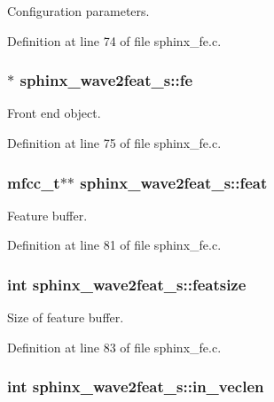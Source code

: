 Configuration parameters. 



Definition at line 74 of file sphinx\-\_\-fe.\-c.

\subsubsection[{fe}]{$\ast$ sphinx\-\_\-wave2feat\-\_\-s\-::fe}\label{structsphinx__wave2feat__s_a5882f148fe200890855304b46f00ee4b}


Front end object. 



Definition at line 75 of file sphinx\-\_\-fe.\-c.

\subsubsection[{feat}]{\setlength{\rightskip}{0pt plus 5cm}mfcc\-\_\-t$\ast$$\ast$ sphinx\-\_\-wave2feat\-\_\-s\-::feat}\label{structsphinx__wave2feat__s_ab43d8d5721133bcaf02da23c0bbb58ae}


Feature buffer. 



Definition at line 81 of file sphinx\-\_\-fe.\-c.

\subsubsection[{featsize}]{\setlength{\rightskip}{0pt plus 5cm}int sphinx\-\_\-wave2feat\-\_\-s\-::featsize}\label{structsphinx__wave2feat__s_ac041852de738a42752be67cceb16660c}


Size of feature buffer. 



Definition at line 83 of file sphinx\-\_\-fe.\-c.

\subsubsection[{in\-\_\-veclen}]{\setlength{\rightskip}{0pt plus 5cm}int sphinx\-\_\-wave2feat\-\_\-s\-::in\-\_\-veclen}\label{structsphinx__wave2feat__s_a3410a9e0c05c0057f31452550fb5380a}


